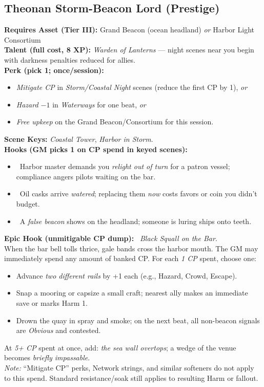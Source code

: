 \documentclass[11pt]{article}
\begin{document}
\subsection*{Theonan Storm-Beacon Lord (Prestige)}
\textbf{Requires Asset (Tier III):} Grand Beacon (ocean headland) \emph{or} Harbor Light Consortium\\
\textbf{Talent (full cost, 8 XP):} \emph{Warden of Lanterns} — night scenes near you begin with darkness penalties reduced for allies.\\
\textbf{Perk (pick 1; once/session):}
\begin{itemize}
  \item \emph{Mitigate CP} in \emph{Storm/Coastal Night} scenes (reduce the first CP by 1), \emph{or}
  \item \emph{Hazard $-1$} in \emph{Waterways} for one beat, \emph{or}
  \item \emph{Free upkeep} on the Grand Beacon/Consortium for this session.
\end{itemize}
\textbf{Scene Keys:} \emph{Coastal Tower}, \emph{Harbor in Storm}.\\[2pt]
\textbf{Hooks (GM picks 1 on CP spend in keyed scenes):}
\begin{itemize}
  \item \clubsuit~Harbor master demands you \emph{relight out of turn} for a patron vessel; compliance angers pilots waiting on the bar.
  \item \diamondsuit~Oil casks arrive \emph{watered}; replacing them \emph{now} costs favors or coin you didn’t budget.
  \item \spadesuit~A \emph{false beacon} shows on the headland; someone is luring ships onto teeth.
\end{itemize}

\textbf{Epic Hook (unmitigable CP dump):} \spadesuit~\emph{Black Squall on the Bar}.\\
When the bar bell tolls thrice, gale bands cross the harbor mouth. The GM may immediately spend any amount of banked CP. For each \emph{1 CP} spent, choose one:
\begin{itemize}
  \item Advance \emph{two different rails} by +1 each (e.g., Hazard, Crowd, Escape).
  \item Snap a mooring or capsize a small craft; nearest ally makes an immediate save or marks Harm 1.
  \item Drown the quay in spray and smoke; on the next beat, all non-beacon signals are \emph{Obvious} and contested.
\end{itemize}
At \emph{5+ CP} spent at once, add: \emph{the sea wall overtops}; a wedge of the venue becomes \emph{briefly impassable}.\\
\emph{Note:} “Mitigate CP” perks, Network strings, and similar softeners do not apply to this spend. Standard resistance/soak still applies to resulting Harm or fallout.
\end{document}
